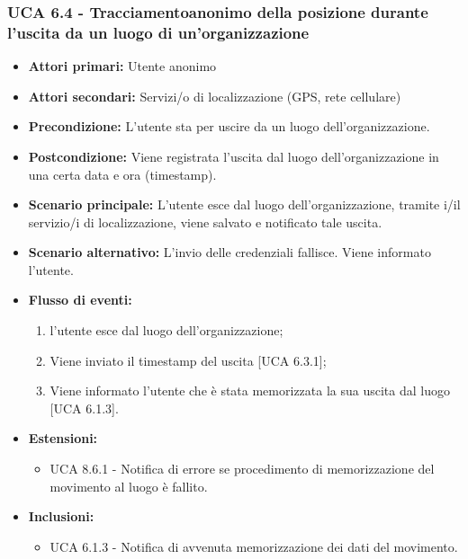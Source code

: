 \subsubsection{UCA 6.4 - Tracciamentoanonimo della posizione durante l'uscita da un luogo di un'organizzazione}
\begin{itemize}
	\item \textbf{Attori primari:} Utente anonimo
	\item \textbf{Attori secondari:} Servizi/o di localizzazione (GPS, rete cellulare)
	\item \textbf{Precondizione:} L'utente sta per uscire da un luogo dell'organizzazione.
	\item \textbf{Postcondizione:} Viene registrata l'uscita dal luogo dell'organizzazione in una certa data e ora (timestamp).
	\item \textbf{Scenario principale:} L'utente esce dal luogo dell'organizzazione, tramite i/il servizio/i di localizzazione, viene salvato e notificato tale uscita. 
	\item \textbf{Scenario alternativo:} L'invio delle credenziali fallisce. Viene informato l'utente.
	\item \textbf{Flusso di eventi:}
	\begin{enumerate}
		\item l'utente esce dal luogo dell'organizzazione;
		\item Viene inviato il timestamp\ap{G}  del uscita [UCA 6.3.1];
		\item Viene informato l'utente che è stata memorizzata la sua uscita dal luogo [UCA 6.1.3].
	\end{enumerate}
	\item \textbf{Estensioni:}
	\begin{itemize}
		\item UCA 8.6.1 - Notifica di errore se procedimento di memorizzazione del movimento al luogo è fallito.
	\end{itemize}
	\item \textbf{Inclusioni:}
	\begin{itemize}
		\item UCA 6.1.3 - Notifica di avvenuta memorizzazione dei dati del movimento.
	\end{itemize}
\end{itemize}
